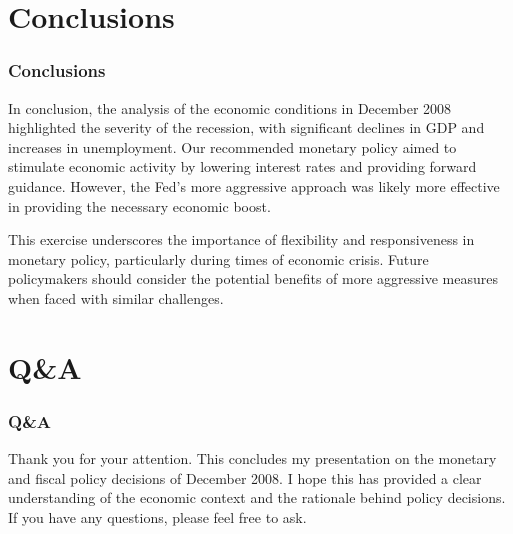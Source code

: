 \documentclass{beamer}
\begin{document}
\section{Conclusions}
\begin{frame}
    \frametitle{Conclusions}
    In conclusion, the analysis of the economic conditions in December 2008 highlighted the severity of the recession, with significant declines in GDP and increases in unemployment. Our recommended monetary policy aimed to stimulate economic activity by lowering interest rates and providing forward guidance. However, the Fed's more aggressive approach was likely more effective in providing the necessary economic boost.
    \newline
    
    This exercise underscores the importance of flexibility and responsiveness in monetary policy, particularly during times of economic crisis. Future policymakers should consider the potential benefits of more aggressive measures when faced with similar challenges.
\end{frame}

\section{Q\&A}
\begin{frame}
    \frametitle{Q\&A}
    Thank you for your attention. This concludes my presentation on the monetary and fiscal policy decisions of December 2008. I hope this has provided a clear understanding of the economic context and the rationale behind policy decisions. If you have any questions, please feel free to ask.
\end{frame}
\end{document}

